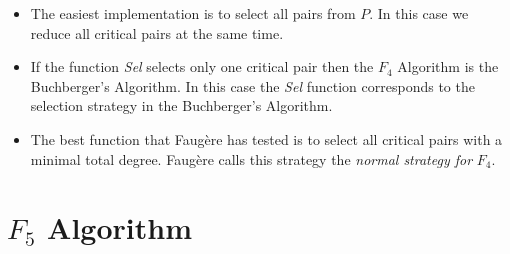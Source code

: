 \begin{itemize}
  \item The easiest implementation is to select all pairs from $P$. In this case we reduce all critical pairs at the same time.
  \item If the function \textit{Sel} selects only one critical pair then the $F_4$ Algorithm is the Buchberger's Algorithm. In this case the \textit{Sel} function corresponds to the selection strategy in the Buchberger's Algorithm.
  \item The best function that Faug\`ere has tested is to select all critical pairs with a minimal total degree. Faug\`ere calls this strategy the \textit{normal strategy for} $F_4$.
\end{itemize}



\section{$F_5$ Algorithm}
